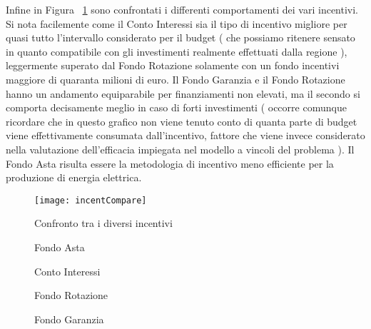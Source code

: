 \documentclass[12pt,a4paper,openright,twoside]{report}
\begin{document}
Infine in Figura ~\ref{incentCompare} sono confrontati i differenti comportamenti dei vari incentivi. Si nota facilemente come il Conto Interessi sia il tipo di incentivo migliore per quasi tutto l'intervallo considerato per il budget ( che possiamo ritenere sensato in quanto compatibile con gli investimenti realmente effettuati dalla regione ), leggermente superato dal Fondo Rotazione solamente con un fondo incentivi maggiore di quaranta milioni di euro. Il Fondo Garanzia e il Fondo Rotazione hanno un andamento equiparabile per finanziamenti non elevati, ma il secondo si comporta decisamente meglio in caso di forti investimenti ( occorre comunque ricordare che in questo grafico non viene tenuto conto di quanta parte di budget viene effettivamente consumata dall'incentivo, fattore che viene invece considerato nella valutazione dell'efficacia impiegata nel modello a vincoli del problema ). Il Fondo Asta risulta essere la metodologia di incentivo meno efficiente per la produzione di energia elettrica.

\begin{figure}[hbt]
	\centering
	\texttt{[image: incentCompare]}
	\caption{Confronto tra i diversi incentivi}
	\label{incentCompare}
\end{figure}

\begin{figure}[H]
	\centering
	\qquad
	\caption{Fondo Asta}
	\label{graphSimA}
\end{figure}

\begin{figure}[H]
	\centering
	\qquad
	\caption{Conto Interessi}
	\label{graphSimCI}
\end{figure}

\begin{figure}[H]
	\centering
	\qquad
	\caption{Fondo Rotazione}
	\label{graphSimR}
\end{figure}

\begin{figure}[H]
	\centering
	\qquad
	\caption{Fondo Garanzia}
	\label{graphSimG}
\end{figure}
\end{document}
